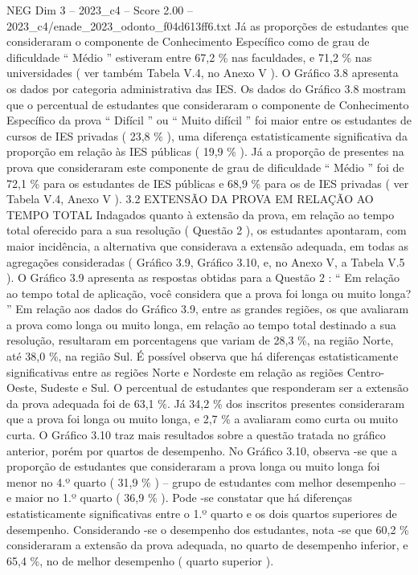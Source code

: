 \begin{textsample}{NEG Dim 3 – 2023\_c4 – Score 2.00 – 2023\_c4/enade\_2023\_odonto\_f04d613ff6.txt}
Já as proporções de estudantes que consideraram o componente de Conhecimento Específico como de grau de dificuldade “ Médio ” estiveram entre 67,2 \% nas faculdades, e 71,2 \% nas universidades ( ver também Tabela V.4, no Anexo V ).
O Gráfico 3.8 apresenta os dados por categoria administrativa das IES.
Os dados do Gráfico 3.8 mostram que o percentual de estudantes que consideraram o componente de Conhecimento Específico da prova “ Difícil ” ou “ Muito difícil ” foi maior entre os estudantes de cursos de IES privadas ( 23,8 \% ), uma diferença estatisticamente significativa da proporção em relação às IES públicas ( 19,9 \% ).
Já a proporção de presentes na prova que consideraram este componente de grau de dificuldade “ Médio ” foi de 72,1 \% para os estudantes de IES públicas e 68,9 \% para os de IES privadas ( ver Tabela V.4, Anexo V ). 3.2 EXTENSÃO DA PROVA EM RELAÇÃO AO TEMPO TOTAL Indagados quanto à extensão da prova, em relação ao tempo total oferecido para a sua resolução ( Questão 2 ), os estudantes apontaram, com maior incidência, a alternativa que considerava a extensão adequada, em todas as agregações consideradas ( Gráfico 3.9, Gráfico 3.10, e, no Anexo V, a Tabela V.5 ).
O Gráfico 3.9 apresenta as respostas obtidas para a Questão 2 : “ Em relação ao tempo total de aplicação, você considera que a prova foi longa ou muito longa? ” Em relação aos dados do Gráfico 3.9, entre as grandes regiões, os que avaliaram a prova como longa ou muito longa, em relação ao tempo total destinado a sua resolução, resultaram em porcentagens que variam de 28,3 \%, na região Norte, até 38,0 \%, na região Sul.
É possível observa que há diferenças estatisticamente significativas entre as regiões Norte e Nordeste em relação as regiões Centro-Oeste, Sudeste e Sul.
O percentual de estudantes que responderam ser a extensão da prova adequada foi de 63,1 \%.
Já 34,2 \% dos inscritos presentes consideraram que a prova foi longa ou muito longa, e 2,7 \% a avaliaram como curta ou muito curta.
O Gráfico 3.10 traz mais resultados sobre a questão tratada no gráfico anterior, porém por quartos de desempenho.
No Gráfico 3.10, observa -se que a proporção de estudantes que consideraram a prova longa ou muito longa foi menor no 4.º quarto ( 31,9 \% ) – grupo de estudantes com melhor desempenho – e maior no 1.º quarto ( 36,9 \% ).
Pode -se constatar que há diferenças estatisticamente significativas entre o 1.º quarto e os dois quartos superiores de desempenho.
Considerando -se o desempenho dos estudantes, nota -se que 60,2 \% consideraram a extensão da prova adequada, no quarto de desempenho inferior, e 65,4 \%, no de melhor desempenho ( quarto superior ).

\end{textsample}

